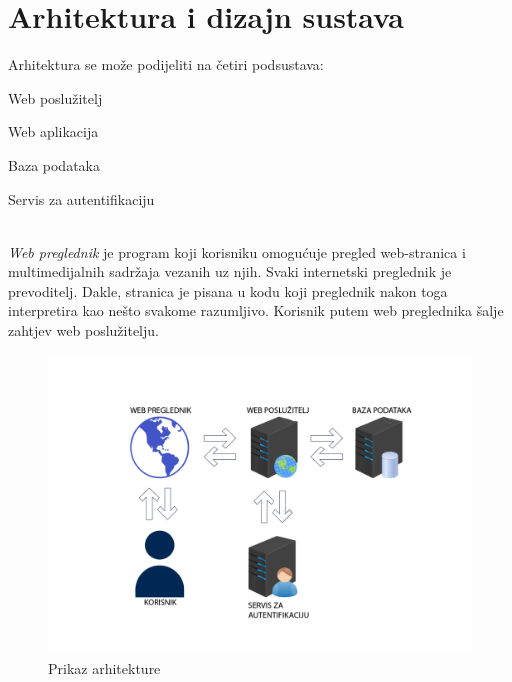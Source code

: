 \chapter{Arhitektura i dizajn sustava}
            \noindent Arhitektura se može podijeliti na četiri podsustava:
            \begin{packed_item}
	
        	\item  Web poslužitelj
        	\item  Web aplikacija
        	\item  Baza podataka
            \item  Servis za autentifikaciju
            \end{packed_item}
            \\
            
\textit{Web preglednik} je program koji korisniku omogućuje pregled web-stranica i multimedijalnih sadržaja vezanih uz njih. Svaki internetski preglednik je prevoditelj. Dakle, stranica je pisana u kodu koji preglednik nakon toga interpretira kao nešto svakome razumljivo. Korisnik putem web preglednika šalje zahtjev web poslužitelju.
\begin{figure}[H]
	\includegraphics[scale=0.4]{slike/ArhitekturaSustava.png} 
	\centering
	\caption{Prikaz arhitekture}
	\label{fig:promjene}
\end{figure}

